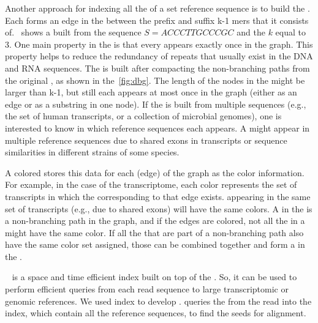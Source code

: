 Another approach for indexing all the \kmers of a set reference sequence is to 
build the \dbg. Each \kmer forms an edge in the \dbg between the 
prefix and suffix k-1 mers that it consists of.~ shows a \dbg 
built from the sequence $S = ACCCTTGCCCGC$ and the $k$ 
equal to 3. One main property in the \dbg is that every \kmer 
appears exactly once in the graph. This property helps to reduce the redundancy 
of repeats that usually exist in the DNA and RNA sequences. The \cdbg
is built after compacting the non-branching paths from the 
original \dbg, as shown in the~\cref{fig:dbg}. The length of the 
nodes in the \cdbg might be larger than k-1, but still 
each \kmer appears at most once in the graph (either as an edge or as a 
substring in one node). If the \dbg is built from multiple 
sequences (e.g., the set of human transcripts, or a collection of microbial 
genomes), one is interested to know in which reference sequences each \kmer 
appears. A \kmer might appear in multiple reference sequences due to shared 
exons in transcripts or sequence similarities in different strains of some 
species.

A colored \dbg stores this data for each \kmer (edge) of the graph as the color 
information. For example, in the case of the transcriptome, each color represents 
the set of transcripts in which the \kmer corresponding to that edge exists. 
\Kmers appearing in the same set of transcripts (e.g., due to shared exons) 
will have the same colors. A \unitig in the \cdbg is a non-branching path in 
the graph, and if the edges are colored, not all the \kmers in a \unitig might 
have the same color.
If all the \kmers that are part of a non-branching path also have the same color 
set assigned, those \kmers can be combined together and form a \unitig in the 
\ccdbg.

\pufferfish~\citep{pufferfish} is a space and time efficient index built on 
top of the \ccdbg. So, it can be used to perform 
efficient \kmer queries from each read sequence to large transcriptomic or 
genomic references. 
We used \pufferfish index to develop \puffaligner.
\puffaligner queries the \kmers from the read into the \pufferfish
index, which contain all the reference sequences, to find the seeds for alignment.

